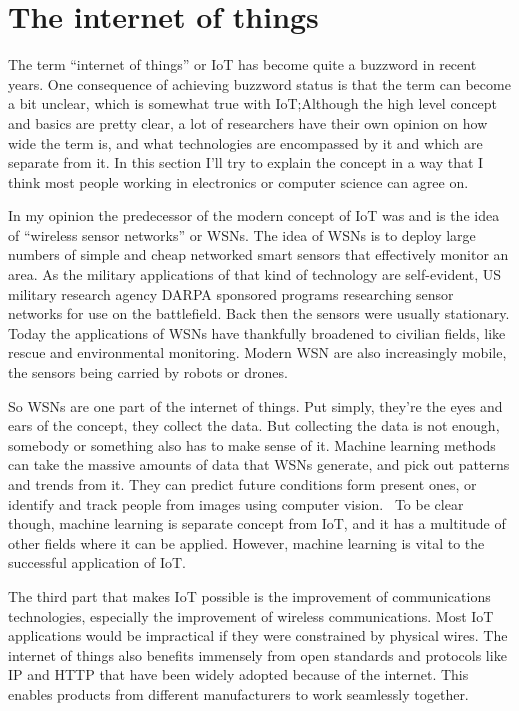 \section{The internet of things}
\label{sec:iot}

The term ``internet of things'' or IoT has become quite a buzzword in recent
years. One consequence of achieving buzzword status is that the term can become
a bit unclear, which is somewhat true with IoT;\@ Although the high level
concept and basics are pretty clear, a lot of researchers have their own
opinion on how wide the term is, and what technologies are encompassed by it
and which are separate from it. In this section I'll try to explain the concept
in a way that I think most people working in electronics or computer science
can agree on.

In my opinion the predecessor of the modern concept of IoT was and is the idea
of ``wireless sensor networks'' or WSNs. The idea of WSNs is to deploy large
numbers of simple and cheap networked smart sensors that effectively monitor an
area. As the military applications of that kind of technology are self-evident,
US military research agency DARPA sponsored programs researching sensor
networks for use on the battlefield. Back then the sensors were usually
stationary. Today the applications of WSNs have thankfully broadened to
civilian fields, like rescue and environmental monitoring. Modern WSN are also
increasingly mobile, the sensors being carried by robots or
drones.~\cite{Chong2003}

So WSNs are one part of the internet of things. Put simply, they're the eyes
and ears of the concept, they collect the data. But collecting the data is not
enough, somebody or something also has to make sense of it. Machine learning
methods can take the massive amounts of data that WSNs generate, and pick out
patterns and trends from it. They can predict future conditions form present
ones, or identify and track people from images using computer
vision.~\cite{Gubbi2013} To be clear though, machine learning is separate
concept from IoT, and it has a multitude of other fields where it can be
applied. However, machine learning is vital to the successful application of
IoT.

The third part that makes IoT possible is the improvement of communications
technologies, especially the improvement of wireless communications. Most IoT
applications would be impractical if they were constrained by physical wires.
The internet of things also benefits immensely from open standards and
protocols like IP and HTTP that have been widely adopted because of the
internet. This enables products from different manufacturers to work seamlessly
together.

